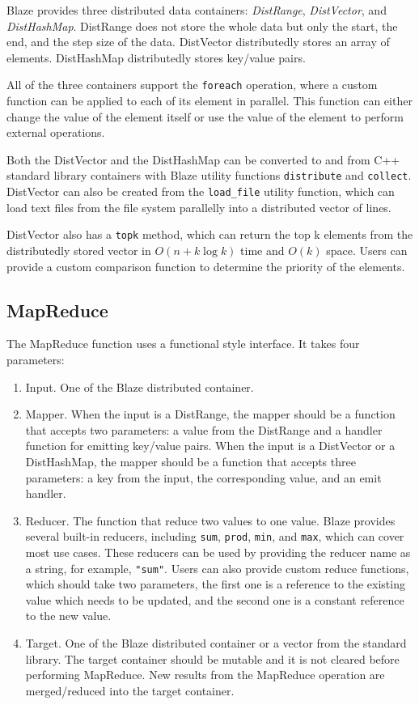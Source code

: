 Blaze provides three distributed data containers: \emph{DistRange}, \emph{DistVector}, and \emph{DistHashMap}.
DistRange does not store the whole data but only the start, the end, and the step size of the data.
DistVector distributedly stores an array of elements.
DistHashMap distributedly stores key/value pairs.

All of the three containers support the \lstinline{foreach} operation, where a custom function can be applied to each of its element in parallel.
This function can either change the value of the element itself or use the value of the element to perform external operations.

Both the DistVector and the DistHashMap can be converted to and from C++ standard library containers with Blaze utility functions \lstinline{distribute} and \lstinline{collect}.
DistVector can also be created from the \lstinline{load_file} utility function, which can load text files from the file system parallelly into a distributed vector of lines.

DistVector also has a \lstinline{topk} method, which can return the top k elements from the distributedly stored vector in $O(n+k\log k)$ time and $O(k)$ space.
Users can provide a custom comparison function to determine the priority of the elements.

\subsection{MapReduce}

The MapReduce function uses a functional style interface.
It takes four parameters:
\begin{enumerate}
    \item Input. One of the Blaze distributed container.
    \item Mapper. When the input is a DistRange, the mapper should be a function that accepts two parameters: a value from the DistRange and a handler function for emitting key/value pairs.
    When the input is a DistVector or a DistHashMap, the mapper should be a function that accepts three parameters: a key from the input, the corresponding value, and an emit handler.
    \item Reducer. The function that reduce two values to one value.
    Blaze provides several built-in reducers, including \lstinline{sum}, \lstinline{prod}, \lstinline{min}, and \lstinline{max}, which can cover most use cases.
    These reducers can be used by providing the reducer name as a string, for example, \lstinline{"sum"}.
    Users can also provide custom reduce functions, which should take two parameters, the first one is a reference to the existing value which needs to be updated, and the second one is a constant reference to the new value.
    \item Target. One of the Blaze distributed container or a vector from the standard library.
    The target container should be mutable and it is not cleared before performing MapReduce.
    New results from the MapReduce operation are merged/reduced into the target container.
\end{enumerate}

